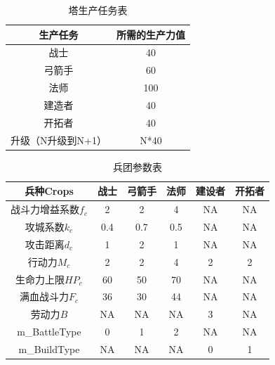\documentclass[a4paper,4pt]{article}
\begin{document}
\begin{table}[htbp]
	\centering
	\caption{塔生产任务表}
	\begin{tabular}{c|c}
		\hline
		生产任务           & 所需的生产力值 \bigstrut \\
		\hline
		战士               & 40 \bigstrut             \\
		\hline
		弓箭手             & 60 \bigstrut             \\
		\hline
		法师               & 100 \bigstrut            \\
		\hline
		建造者             & 40 \bigstrut             \\
		\hline
		开拓者             & 40 \bigstrut             \\
		\hline
		升级（N升级到N+1） & N*40 \bigstrut           \\
		\hline
	\end{tabular}%
	\label{塔生产}%
\end{table}%

\begin{table}[htbp]
	\centering
	\caption{兵团参数表}
	\begin{tabular}{c|c|c|c|c|c}
		\hline
		兵种Crops           & 战士 & 弓箭手 & 法师 & 建设者 & 开拓者 \bigstrut \\
		\hline
		战斗力增益系数$f_c$ & 2    & 2      & 4    & NA     & NA \bigstrut     \\
		\hline
		攻城系数$k_c$       & 0.4  & 0.7    & 0.5  & NA     & NA \bigstrut     \\
		\hline
		攻击距离$d_c$       & 1    & 2      & 1    & NA     & NA \bigstrut     \\
		\hline
		行动力$M_c$         & 2    & 2      & 4    & 2      & 2 \bigstrut      \\
		\hline
		生命力上限$HP_c$    & 60   & 50     & 70   & NA     & NA \bigstrut     \\
		\hline
		满血战斗力$F_c$     & 36   & 30     & 44   & NA     & NA \bigstrut     \\
		\hline
		劳动力$B$           & NA   & NA     & NA   & 3      & NA \bigstrut     \\
		\hline
		m\_BattleType       & 0    & 1      & 2    & NA     & NA \bigstrut     \\
		\hline
		m\_BuildType        & NA   & NA     & NA   & 0      & 1 \bigstrut      \\
		\hline
	\end{tabular}%
	\label{兵团}%
\end{table}%
\end{document}

